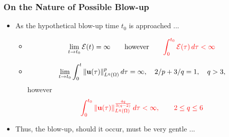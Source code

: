 \documentclass{beamer}
\def\Bmp#1{ \begin{minipage}{#1} }
\def\Emp{ \end{minipage} }
\def\E{{\mathcal{E}}}
\def\red#1{{\color{red}{ #1 }}}
\def\u{{\bf u}}
\begin{document}
\frame
{
\frametitle{On the Nature of Possible Blow-up}
\hspace*{-1.0cm}
\Bmp{12cm}
\raggedright


\begin{itemize}
\item<1->
As the hypothetical blow-up time $t_0$ is approached ...

\begin{itemize}
  \item<2->[$\bullet$]
  \begin{equation*}
    \lim_{t \rightarrow t_0} \E(t) = \infty  \qquad \hfill
    \text{however} \hfill 
    \qquad \red{\int_0^{t_0} \E(\tau) \, d\tau < \infty}
  \end{equation*}
\bigskip

\item<3->[$\bullet$]
  \begin{equation*}
    \lim_{t \rightarrow t_0} \int_0^t \| \u(\tau) \|_{L^q(\Omega)}^p \, d\tau = \infty, \quad 2/p+3/q = 1, \quad q > 3,
  \end{equation*}
  however
  \begin{equation*}
\red{\int_0^{t_0} \| \u(\tau) \|_{L^q(\Omega)}^{\frac{4q}{3(q-2)}} \,
  d\tau < \infty, \qquad 2 \le q \le 6}
\end{equation*}
\end{itemize}

\bigskip
\item<4-> Thus, the blow-up, should it occur, must be very gentle ...

\end{itemize}

\Emp
}


\end{document}
